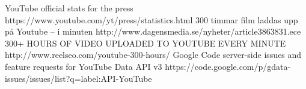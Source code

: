 \begin{thebibliography}{2}
		YouTube official stats for the press
		https://www.youtube.com/yt/press/statistics.html
		300 timmar film laddas upp på Youtube – i minuten
		http://www.dagensmedia.se/nyheter/article3863831.ece
		300+ HOURS OF VIDEO UPLOADED TO YOUTUBE EVERY MINUTE
		http://www.reelseo.com/youtube-300-hours/
		Google Code server-side issues and feature requests for YouTube Data API v3
		https://code.google.com/p/gdata-issues/issues/list?q=label:API-YouTube
\end{thebibliography}
